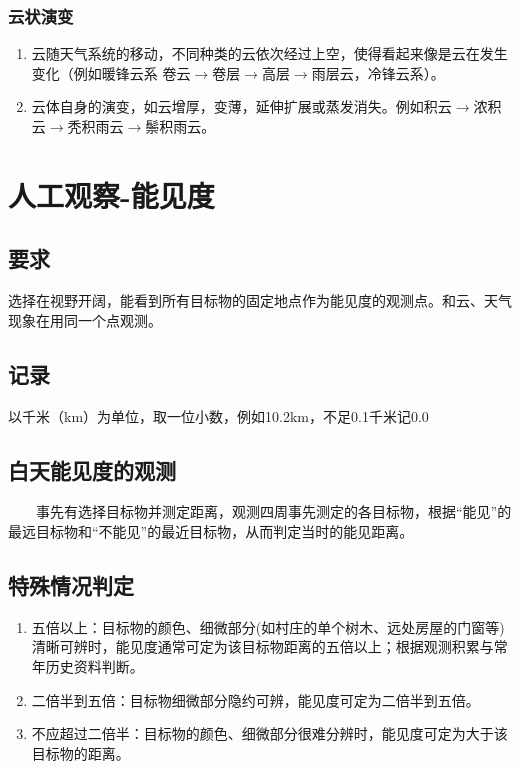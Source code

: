 ﻿\documentclass[UTF8,11pt]{ctexbook}%
\begin{document}
\subsubsection{云状演变}

\begin{enumerate}
	\item 云随天气系统的移动，不同种类的云依次经过上空，使得看起来像是云在发生变化（例如暖锋云系 卷云\(\to\)卷层\(\to\)高层\(\to\)雨层云，冷锋云系）。
	\item 云体自身的演变，如云增厚，变薄，延伸扩展或蒸发消失。例如积云\(\to\)浓积云\(\to\)秃积雨云\(\to\)鬃积雨云。
\end{enumerate}

\section{人工观察-能见度}

\subsection{要求}

选择在视野开阔，能看到所有目标物的固定地点作为能见度的观测点。和云、天气现象在用同一个点观测。

\subsection{记录}

以千米（km）为单位，取一位小数，例如10.2km，不足0.1千米记0.0

\subsection{白天能见度的观测}

　　事先有选择目标物并测定距离，观测四周事先测定的各目标物，根据“能见”的最远目标物和“不能见”的最近目标物，从而判定当时的能见距离。

\subsection{特殊情况判定}

\begin{enumerate}
	\item 五倍以上：目标物的颜色、细微部分(如村庄的单个树木、远处房屋的门窗等)清晰可辨时，能见度通常可定为该目标物距离的五倍以上；根据观测积累与常年历史资料判断。
	\item 二倍半到五倍：目标物细微部分隐约可辨，能见度可定为二倍半到五倍。
	\item 不应超过二倍半：目标物的颜色、细微部分很难分辨时，能见度可定为大于该目标物的距离。
\end{enumerate}
\end{document}
